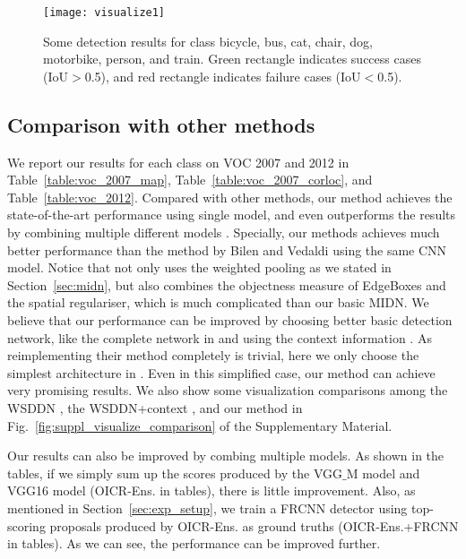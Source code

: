 \documentclass[10pt,twocolumn,letterpaper]{article}
\def\methodname{OICR}
\begin{document}
\begin{figure*}[!t]
\begin{center}
   \texttt{[image: visualize1]}
\end{center}
   \caption{Some detection results for class bicycle, bus, cat, chair, dog, motorbike, person, and train.
   Green rectangle indicates success cases (IoU$>$0.5), and red rectangle indicates failure cases (IoU$<$0.5).}
\label{fig:visualize1}
\end{figure*}



\subsection{Comparison with other methods}
\label{sec:compar}

We report our results for each class on VOC 2007 and 2012 in Table~\ref{table:voc_2007_map}, Table~\ref{table:voc_2007_corloc}, and Table~\ref{table:voc_2012}.
Compared with other methods, our method achieves the state-of-the-art performance using single model, and even outperforms the results by combining multiple different models \cite{Ref:Bilen2016,Ref:Li2016}.
Specially, our methods achieves much better performance than the method by Bilen and Vedaldi \cite{Ref:Bilen2016} using the same CNN model.
Notice that \cite{Ref:Bilen2016} not only uses the weighted pooling as we stated in Section~\ref{sec:midn}, but also combines the objectness measure of EdgeBoxes \cite{Ref:Zitnick2014} and the spatial regulariser, which is much complicated than our basic MIDN.
We believe that our performance can be improved by choosing better basic detection network, like the complete network in \cite{Ref:Bilen2016} and using the context information \cite{Ref:Kantorov2016}.
As reimplementing their method completely is trivial, here we only choose the simplest architecture in \cite{Ref:Bilen2016}.
Even in this simplified case, our method can achieve very promising results.
We also show some visualization comparisons among the WSDDN \cite{Ref:Bilen2016}, the WSDDN+context \cite{Ref:Kantorov2016}, and our method in Fig.~\ref{fig:suppl_visualize_comparison} of the Supplementary Material.

Our results can also be improved by combing multiple models.
As shown in the tables, if we simply sum up the scores produced by the VGG$\_$M model and VGG16 model (\methodname-Ens. in tables), there is little improvement.
Also, as mentioned in Section~\ref{sec:exp_setup}, we train a FRCNN detector using top-scoring proposals produced by \methodname-Ens. as ground truths (\methodname-Ens.+FRCNN in tables).
As we can see, the performance can be improved further.
\end{document}
